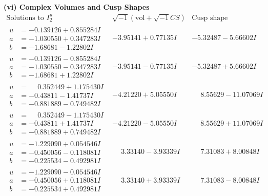 \documentclass[1p]{elsarticle_modified}
\theoremstyle{definition}
\newcommand{\I}{\sqrt{-1}}
\begin{document}
\newpage\flushleft \textbf{(vi) Complex Volumes and Cusp Shapes}
$$\begin{array}{c|c|c}  
\text{Solutions to }I^u_{2}& \I (\text{vol} + \sqrt{-1}CS) & \text{Cusp shape}\\
 \hline 
\begin{aligned}
u &= -0.139126 + 0.855284 I \\
a &= -1.030550 + 0.347283 I \\
b &= -1.68681 - 1.22802 I\end{aligned}
 & -3.95141 + 0.77135 I & -5.32487 - 5.66602 I \\ \hline\begin{aligned}
u &= -0.139126 - 0.855284 I \\
a &= -1.030550 - 0.347283 I \\
b &= -1.68681 + 1.22802 I\end{aligned}
 & -3.95141 - 0.77135 I & -5.32487 + 5.66602 I \\ \hline\begin{aligned}
u &= \phantom{-}0.352449 + 1.175430 I \\
a &= -0.43811 - 1.41737 I \\
b &= -0.881889 - 0.749482 I\end{aligned}
 & -4.21220 + 5.05550 I & \phantom{-}8.55629 - 11.07069 I \\ \hline\begin{aligned}
u &= \phantom{-}0.352449 - 1.175430 I \\
a &= -0.43811 + 1.41737 I \\
b &= -0.881889 + 0.749482 I\end{aligned}
 & -4.21220 - 5.05550 I & \phantom{-}8.55629 + 11.07069 I \\ \hline\begin{aligned}
u &= -1.229090 + 0.054546 I \\
a &= -0.450056 - 0.118081 I \\
b &= -0.225534 - 0.492981 I\end{aligned}
 & \phantom{-}3.33140 - 3.93339 I & \phantom{-}7.31083 + 8.00848 I \\ \hline\begin{aligned}
u &= -1.229090 - 0.054546 I \\
a &= -0.450056 + 0.118081 I \\
b &= -0.225534 + 0.492981 I\end{aligned}
 & \phantom{-}3.33140 + 3.93339 I & \phantom{-}7.31083 - 8.00848 I \\ \hline\begin{aligned}

\end{aligned}
\end{array}$$
\end{document}
